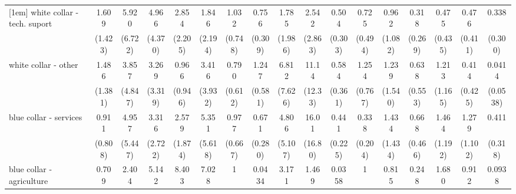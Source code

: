 {\begin{tabular}{l*{16}{c}}
[1em]
white collar - tech. suport&       1.609         &       5.920         &       4.966         &       2.854         &       1.846         &       1.032         &       0.756         &       1.785         &       2.542         &       0.504         &       0.725         &       0.962         &       0.318         &       0.475         &       0.476         &       0.338         \\
                    &     (1.423)         &     (6.722)         &     (4.370)         &     (2.205)         &     (2.194)         &     (0.748)         &     (0.309)         &     (1.986)         &     (2.863)         &     (0.303)         &     (0.494)         &     (1.082)         &     (0.269)         &     (0.435)         &     (0.411)         &     (0.300)         \\
[1em]
white collar - other&       1.486         &       3.857         &       3.269         &       0.966         &       3.416         &       0.790         &       1.247         &       6.812         &       11.14\sym{*}  &       0.584         &       1.254         &       1.239         &       0.638         &       1.213         &       0.414         &      0.0414\sym{*}  \\
                    &     (1.381)         &     (4.847)         &     (3.319)         &     (0.946)         &     (3.932)         &     (0.612)         &     (0.581)         &     (7.626)         &     (12.33)         &     (0.361)         &     (0.767)         &     (1.540)         &     (0.553)         &     (1.165)         &     (0.425)         &    (0.0538)         \\
[1em]
blue collar - services&       0.911         &       4.957         &       3.316         &       2.579         &       5.351         &       0.977         &       0.671         &       4.806         &       16.01\sym{**} &       0.441         &       0.338         &       1.434         &       0.668         &       1.464         &       1.279         &       0.411         \\
                    &     (0.808)         &     (5.447)         &     (2.722)         &     (1.874)         &     (5.618)         &     (0.667)         &     (0.280)         &     (5.107)         &     (16.80)         &     (0.225)         &     (0.204)         &     (1.434)         &     (0.466)         &     (1.192)         &     (1.102)         &     (0.318)         \\
[1em]
blue collar - agriculture&       0.709         &       2.404         &       5.142         &       8.403\sym{*}  &       7.028         &           1         &      0.0434\sym{**} &       3.171         &       1.469         &      0.0358\sym{**} &           1         &       0.815         &       0.248         &       1.680         &       0.912         &      0.0938\sym{*}  \\

\end{tabular}}

